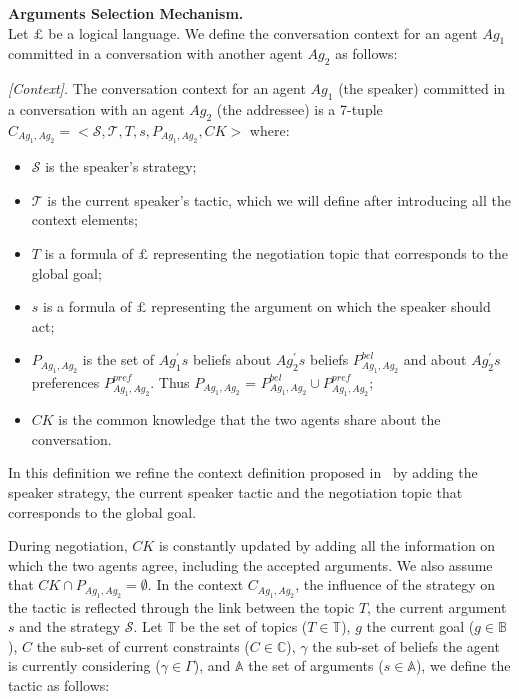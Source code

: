 \textbf{Arguments Selection Mechanism.} \\
Let $\pounds$ be a logical language. We define the conversation context for an agent $Ag_1$ committed in a conversation with
another agent $Ag_2$ as follows:

\begin{definition}{\emph{[Context].}} \label{context}
The conversation context for an agent $Ag_1$ (the speaker) committed in a conversation with an agent $Ag_2$ (the addressee)
is a 7-tuple $C_{Ag_1,Ag_2} = \big<\mathcal{S},\mathcal{T},T,s,P_{Ag_1,Ag_2},CK\big>$ where:
\begin{itemize}
  \item $\mathcal{S}$ is the speaker's strategy;

  \item $\mathcal{T}$ is the current speaker's tactic, which we will define after introducing all the context elements;

  \item $T$ is a formula of $\pounds$ representing the negotiation topic that corresponds to the global goal;

  \item $s$ is a formula of $\pounds$ representing the argument on which the speaker should act;

  \item $P_{Ag_1,Ag_2}$ is the set of $Ag_{1}^{\prime}s$ beliefs about $Ag_{2}^{\prime}s$ beliefs $P^{bel}_{Ag_1,Ag_2}$ and
   about $Ag_{2}^{\prime}s$ preferences $P^{pref}_{Ag_1,Ag_2}$.   Thus $P_{Ag_1,Ag_2}$ = $P^{bel}_{Ag_1,Ag_2} \cup P^{pref}_{Ag_1,Ag_2}$;

  \item $CK$ is the common knowledge that the two agents share about the conversation.
\end{itemize}
In this definition we refine the context definition proposed in~\cite{Mbarki06} by adding the speaker strategy, the current
speaker tactic and the negotiation topic that corresponds to the global goal.
\end{definition}
During negotiation, $CK$ is constantly updated by adding all the information on which the two agents agree, including the accepted
arguments. We also assume that $CK \cap P_{Ag_1,Ag_2} = \emptyset$. In the context $C_{Ag_1,Ag_2}$, the influence of the
strategy on the tactic is reflected through the link between the topic $T$, the current argument $s$ and the strategy
$\mathcal{S}$. Let $\mathbb{T}$ be the set of topics ($T \in \mathbb{T}$), $g$ the current goal ($g \in \mathbb{B}$), $C$ the
sub-set of current constraints ($C \in \mathbb{C}$), $\gamma$ the sub-set of beliefs the agent is currently considering ($\gamma \in
\Gamma$), and $\mathbb{A}$ the set of arguments ($s \in \mathbb{A}$), we define the tactic as follows:

